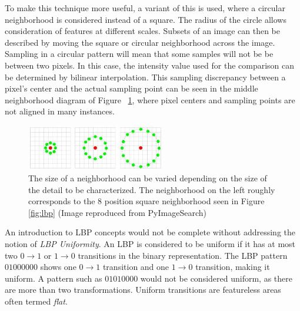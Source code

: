 \documentclass[letterpaper]{article}
\begin{document}
{To make this technique more useful, a variant of this is used, where a circular neighborhood is considered instead of a square. The radius of the circle allows consideration of features at different scales.  Subsets of an image can then be described by moving the square or circular neighborhood across the image.  Sampling in a circular pattern will mean that some samples will not be be between two pixels. In this case, the intensity value used for the comparison can be determined by bilinear interpolation. This sampling discrepancy between a pixel's center and the actual sampling point can be seen in the middle neighborhood diagram of Figure ~\ref{fig:lbp-circular}, where pixel centers and sampling points are not aligned in many instances.

\begin{figure}[H]
	\centering
	\includegraphics[height=2cm]{./figures/lbp_circular.jpg}	
	\caption[Local Binary Pattern circular neighborhoods]{The size of a neighborhood can be varied depending on the size of the detail to be characterized. The neighborhood on the left roughly corresponds to the 8 position square neighborhood seen in Figure \ref{fig:lbp} (Image reproduced from PyImageSearch)}
	\label{fig:lbp-circular}
\end{figure}

An introduction to LBP concepts would not be complete without addressing the notion of \textit{LBP Uniformity}. An LBP is considered to be uniform if it has at most two $0 \rightarrow 1$ or $1 \rightarrow 0$ transitions in the binary representation. The LBP pattern $01000000$ shows one $0 \rightarrow 1$ transition and one $1 \rightarrow 0$ transition, making it uniform. A pattern such as $01010000$ would not be considered uniform, as there are more than two transformations. Uniform transitions are featureless areas often termed \textit{flat}.

%

}
\end{document}
